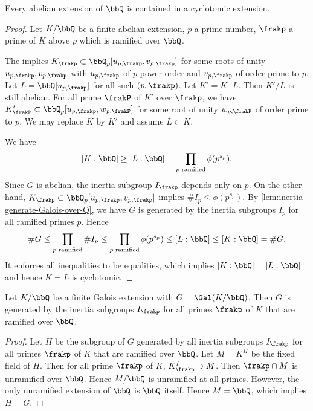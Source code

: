   \begin{theorem}
    Every abelian extension of $\bbQ$ is contained in a cyclotomic extension.
  \end{theorem}
  \begin{proof}
    Let $K/\bbQ$ be a finite abelian extension, $p$ a prime number, $\frakp$ a prime of $K$ above $p$ which is ramified over $\bbQ$.
    
    The  implies $K_\frakp \subset \bbQ_p[u_{p,\frakp},v_{p,\frakp}]$ for some roots of unity $u_{p,\frakp},v_{p,\frakp}$ with $u_{p,\frakp}$ of $p$-power order and $v_{p,\frakp}$ of order prime to $p$.
    Let $L = \bbQ[{u_{p,\frakp}}]$ for all such $(p,\frakp)$.
    Let $K' = K \cdot L$.
    Then $K'/L$ is still abelian.
    For all prime $\frakP$ of $K'$ over $\frakp$, we have $K'_\frakP \subset \bbQ_p[u_{p,\frakp}, w_{p,\frakP}]$ for some root of unity $w_{p,\frakP}$ of order prime to $p$.
    We may replace $K$ by $K'$ and assume $L \subset K$.

    We have 
    \[ [K:\bbQ] \geq [L:\bbQ] = \prod_{p \text{ ramified}}\phi(p^{s_p}). \]
    Since $G$ is abelian, the inertia subgroup $I_\frakp$ depends only on $p$.
    On the other hand, $K_\frakp \subset \bbQ_p[u_{p,\frakp}, v_{p,\frakp}]$ implies $\#I_p \leq \phi(p^{s_p})$.
    By \cref{lem:inertia-generate-Galois-over-Q}, we have $G$ is generated by the inertia subgroups $I_p$ for all ramified primes $p$.
    Hence 
    \[ \# G \leq \prod_{p \text{ ramified}} \#I_p \leq \prod_{p \text{ ramified}} \phi(p^{s_p}) \leq [L:\bbQ] \leq [K:\bbQ] = \# G. \]
    It enforces all inequalities to be equalities, which implies $[K:\bbQ] = [L:\bbQ]$ and hence $K = L$ is cyclotomic.
  \end{proof}

  \begin{lemma}\label{lem:inertia-generate-Galois-over-Q}
    Let $K/\bbQ$ be a finite Galois extension with $G = \Gal(K/\bbQ)$.
    Then $G$ is generated by the inertia subgroups $I_\frakp$ for all primes $\frakp$ of $K$ that are ramified over $\bbQ$.
  \end{lemma}
  \begin{proof}
    Let $H$ be the subgroup of $G$ generated by all inertia subgroups $I_\frakp$ for all primes $\frakp$ of $K$ that are ramified over $\bbQ$.
    Let $M = K^H$ be the fixed field of $H$.
    Then for all prime $\frakp$ of $K$, $K^I_\frakp \supset M$.
    Then $\frakp \cap M$ is unramified over $\bbQ$.
    Hence $M/\bbQ$ is unramified at all primes.
    However, the only unramified extension of $\bbQ$ is $\bbQ$ itself.
    Hence $M = \bbQ$, which implies $H = G$.
  \end{proof}



